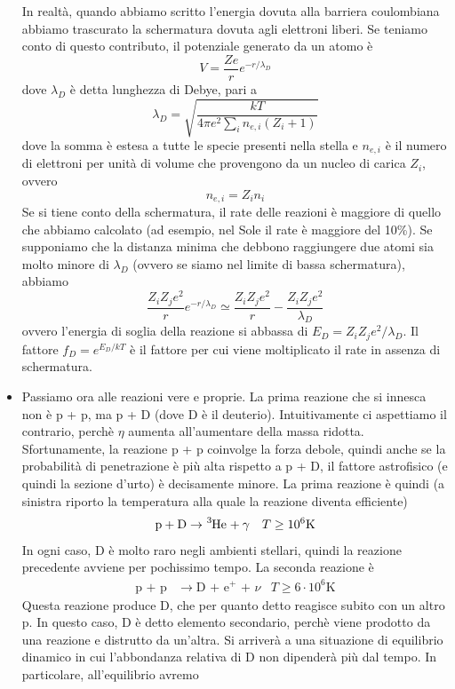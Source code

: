\documentclass[a4paper,11pt]{article}
\theoremstyle{theorem}
\theoremstyle{definition}
\begin{document}
\begin{itemize}
		\noindent In realtà, quando abbiamo scritto l'energia dovuta alla barriera coulombiana abbiamo trascurato la schermatura dovuta agli elettroni liberi. Se teniamo conto di questo contributo, il potenziale generato da un atomo è
		\[V=\frac{Ze}{r}e^{-r/\lambda_D}\]
		dove $\lambda_D$ è detta lunghezza di Debye, pari a 
		\[\lambda_D=\sqrt{\frac{kT}{4\pi e^2\sum_{i}n_{e,i}(Z_i+1)}}\]
		dove la somma è estesa a tutte le specie presenti nella stella e $n_{e,i}$ è il numero di elettroni per unità di volume che provengono da un nucleo di carica $Z_i$, ovvero
		\[n_{e,i}=Z_in_i\]
		Se si tiene conto della schermatura, il rate delle reazioni è maggiore di quello che abbiamo calcolato (ad esempio, nel Sole il rate è maggiore del 10\%). Se supponiamo che la distanza minima che debbono raggiungere due atomi sia molto minore di $\lambda_D$ (ovvero se siamo nel limite di bassa schermatura), abbiamo
		\[\frac{Z_iZ_je^2}{r}e^{-r/\lambda_D}\simeq\frac{Z_iZ_je^2}{r}-\frac{Z_iZ_je^2}{\lambda_D}\]
		ovvero l'energia di soglia della reazione si abbassa di $E_D=Z_iZ_je^2/\lambda_D$. Il fattore $f_D=e^{E_D/kT}$ è il fattore per cui viene moltiplicato il rate in assenza di schermatura.
		\item Passiamo ora alle reazioni vere e proprie. La prima reazione che si innesca non è p + p, ma p + D (dove D è il deuterio). Intuitivamente ci aspettiamo il contrario, perchè $\eta$ aumenta all'aumentare della massa ridotta. Sfortunamente, la reazione p + p coinvolge la forza debole, quindi anche se la probabilità di penetrazione è più alta rispetto a p + D, il fattore astrofisico (e quindi la sezione d'urto) è decisamente minore. La prima reazione è quindi (a sinistra riporto la temperatura alla quale la reazione diventa efficiente)
		\begin{align*}\mathrm{p + D}&\rightarrow\tensor[^3]{\mathrm{He}}{}+\gamma&T\geq 10^6\mathrm{ K}\end{align*}
		In ogni caso, D è molto raro negli ambienti stellari, quindi la reazione precedente avviene per pochissimo tempo. La seconda reazione è
		\begin{align*}
			\textrm{p + p}&\rightarrow\textrm{D + e$^+$ + $\nu$}&T\geq 6\cdot 10^6\mathrm{ K}
		\end{align*}
		Questa reazione produce D, che per quanto detto reagisce subito con un altro p. In questo caso, D è detto elemento secondario, perchè viene prodotto da una reazione e distrutto da un'altra. Si arriverà a una situazione di equilibrio dinamico in cui l'abbondanza relativa di D non dipenderà più dal tempo. In particolare, all'equilibrio avremo

\end{itemize}
\end{document}
